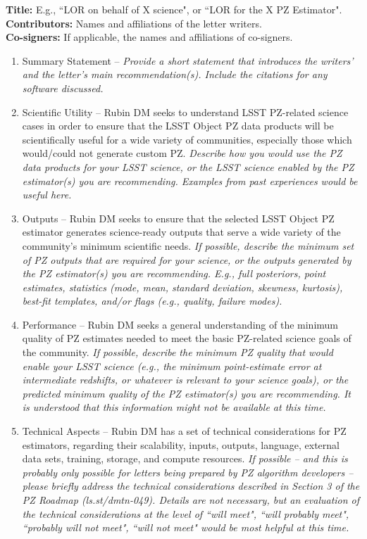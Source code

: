 \documentclass[DM,authoryear,toc]{lsstdoc}
\begin{document}
\textbf{Title:} E.g., ``LOR on behalf of X science", or ``LOR for the X PZ Estimator". \\
\textbf{Contributors:} Names and affiliations of the letter writers. \\
\textbf{Co-signers:} If applicable, the names and affiliations of co-signers.

\begin{enumerate}
\item Summary Statement -- 
\textit{Provide a short statement that introduces the writers' and the letter's main recommendation(s).
Include the citations for any software discussed.
}
\item Scientific Utility -- 
Rubin DM seeks to understand LSST PZ-related science cases in order to ensure that the LSST Object PZ data products will be scientifically useful for a wide variety of communities, especially those which would/could not generate custom PZ. 
\textit{Describe how you would use the PZ data products for your LSST science, or the LSST science enabled by the PZ estimator(s) you are recommending.
Examples from past experiences would be useful here.
}
\item Outputs -- 
Rubin DM seeks to ensure that the selected LSST Object PZ estimator generates science-ready outputs that serve a wide variety of the community's minimum scientific needs. 
\textit{If possible, describe the minimum set of PZ outputs that are required for your science, or the outputs generated by the PZ estimator(s) you are recommending.
E.g., full posteriors, point estimates, statistics (mode, mean, standard deviation, skewness, kurtosis), best-fit templates, and/or flags (e.g., quality, failure modes).
}
\item Performance -- 
Rubin DM seeks a general understanding of the minimum quality of PZ estimates needed to meet the basic PZ-related science goals of the community.
\textit{If possible, describe the minimum PZ quality that would enable your LSST science (e.g., the minimum point-estimate error at intermediate redshifts, or whatever is relevant to your science goals), or the predicted minimum quality of the PZ estimator(s) you are recommending.
It is understood that this information might not be available at this time.
}
\item Technical Aspects -- 
Rubin DM has a set of technical considerations for PZ estimators, regarding their scalability, inputs, outputs, language, external data sets, training, storage, and compute resources.
\textit{If possible -- and this is probably only possible for letters being prepared by PZ algorithm developers -- please briefly address the technical considerations described in Section 3 of the PZ Roadmap (ls.st/dmtn-049).
Details are not necessary, but an evaluation of the technical considerations at the level of ``will meet", ``will probably meet", ``probably will not meet", ``will not meet" would be most helpful at this time.
}
\end{enumerate}
\end{document}
